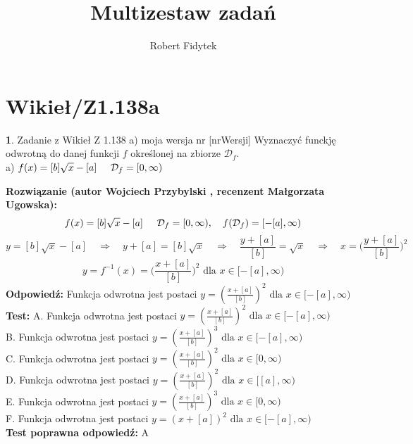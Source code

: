 \documentclass[12pt, a4paper]{article}
\title{Multizestaw zadań}
\author{Robert Fidytek}
\date{}
\theoremstyle{definition} %
\newtheorem{zad}{}
\newcommand{\kategoria}[1]{\section{#1}} %
\newcommand{\zadStart}[1]{\begin{zad}#1\newline} %
\newcommand{\zadStop}{\end{zad}}   %
\newcommand{\rozwStart}[2]{\noindent \textbf{Rozwiązanie (autor #1 , recenzent #2): }\newline} %
\newcommand{\rozwStop}{\newline}                                            %
\newcommand{\odpStart}{\noindent \textbf{Odpowiedź:}\newline}    %
\newcommand{\odpStop}{\newline}                                             %
\newcommand{\testStart}{\noindent \textbf{Test:}\newline} %
\newcommand{\testStop}{\newline} %
\newcommand{\kluczStart}{\noindent \textbf{Test poprawna odpowiedź:}\newline} %
\newcommand{\kluczStop}{\newline} %
\begin{document}
\maketitle


\kategoria{Wikieł/Z1.138a}
\zadStart{Zadanie z Wikieł Z 1.138 a) moja wersja nr [nrWersji]}
Wyznaczyć funckję odwrotną do danej funkcji $f$ określonej na zbiorze $\mathcal{D}_{f}$.\\
a) $f(x)=[b]\sqrt{x}-[a]\hspace{5mm}\mathcal{D}_{f}=[0,\infty)$
\zadStop
\rozwStart{Wojciech Przybylski}{Małgorzata Ugowska}
$$f(x)=[b]\sqrt{x}-[a]\hspace{5mm} \mathcal{D}_{f}=[0,\infty), \quad  f(\mathcal{D}_{f})=[-[a],\infty)$$
$$y=[b]\sqrt{x}-[a] \quad \Rightarrow \quad y+[a]=[b]\sqrt{x} \quad \Rightarrow \quad \frac{y+[a]}{[b]}=\sqrt{x} \quad \Rightarrow \quad x=\Big(\frac{y+[a]}{[b]}\Big)^{2}$$
$$y=f^{-1}(x)=\Big(\frac{x+[a]}{[b]}\Big)^{2} \mbox{ dla }x\in[-[a],\infty) $$
\rozwStop
\odpStart
Funkcja odwrotna jest postaci $y=(\frac{x+[a]}{[b]})^{2} \mbox{ dla }x\in[-[a],\infty)$
\odpStop
\testStart
A. Funkcja odwrotna jest postaci $y=(\frac{x+[a]}{[b]})^{2} \mbox{ dla }x\in[-[a],\infty)$\\
B. Funkcja odwrotna jest postaci $y=(\frac{x+[a]}{[b]})^{3} \mbox{ dla }x\in[-[a],\infty)$\\
C. Funkcja odwrotna jest postaci $y=(\frac{x+[a]}{[b]})^{2} \mbox{ dla }x\in[0,\infty)$\\
D. Funkcja odwrotna jest postaci $y=(\frac{x+[a]}{[b]})^{2} \mbox{ dla }x\in[[a],\infty)$\\
E. Funkcja odwrotna jest postaci $y=(\frac{x+[a]}{[b]})^{3} \mbox{ dla }x\in[0,\infty)$\\
F. Funkcja odwrotna jest postaci $y=(x+[a])^{2} \mbox{ dla }x\in[-[a],\infty)$\\
\testStop
\kluczStart
A
\kluczStop
\end{document}
